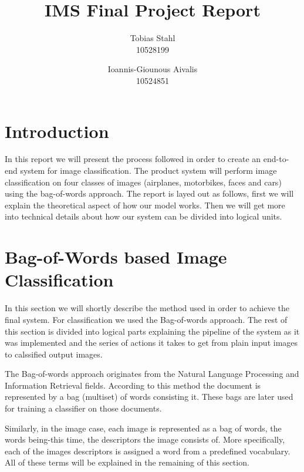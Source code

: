 \documentclass[11pt]{article}
\title{
	\textbf{IMS Final Project Report}
}
\author{Tobias Stahl \\ 10528199 \and Ioannis-Giounous Aivalis \\ 10524851 }
\begin{document}
\maketitle

\section{Introduction}
In this report we will present the process followed in order to create an end-to-end system for image classification. The product system will perform image classification on four classes of images (airplanes, motorbikes, faces and cars) using the bag-of-words approach.
The report is layed out as follows, first we will explain the theoretical aspect of how our model works. Then we will get more into technical details about how our system can be divided into logical units.

\section{Bag-of-Words based Image Classification}
In this section we will shortly describe the method used in order to achieve the final system. For classification we used the Bag-of-words approach. The rest of this section is divided into logical parts explaining the pipeline of the system as it was implemented and the series of actions it takes to get from plain input images to calssified output images.

The Bag-of-words approach originates from the Natural Language Processing and Information Retrieval fields. According to this method the document is represented by a bag (multiset) of words consisting it. These bags are later used for training a classifier on those documents.

Similarly, in the image case, each image is represented as a bag of words, the words being-this time, the descriptors the image consists of. More specifically, each of the images descriptors is assigned a word from a predefined vocabulary. All of these terms will be explained in the remaining of this section. 
\end{document}
